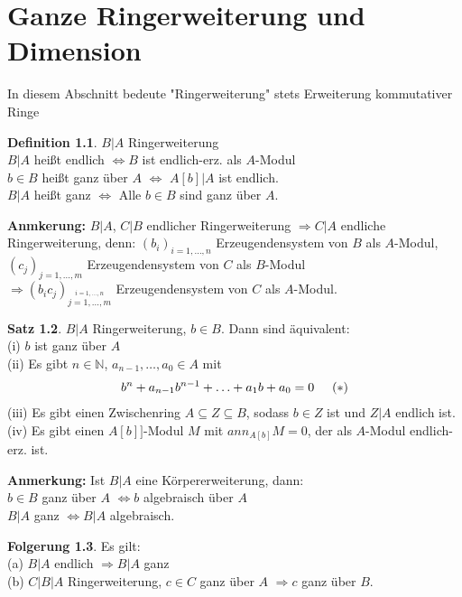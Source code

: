 \documentclass[10pt,a4paper,numbers=endperiod]{scrreprt}
\theoremstyle{definition}
\newtheorem{satz}{Satz}[section]
\newtheorem{defi}[satz]{Definition}
\newtheorem{folg}[satz]{Folgerung}
\def\NN{{\mathbb N}}
\begin{document}
\chapter{Ganze Ringerweiterung und Dimension}

In diesem Abschnitt bedeute "Ringerweiterung" stets Erweiterung kommutativer Ringe

\begin{defi}
	$B|A$ Ringerweiterung\\
	$B|A$ heißt endlich $\Leftrightarrow B$ ist endlich-erz. als $A$-Modul\\
	$b \in B$ heißt ganz über $A$ $\Leftrightarrow$ $A[b]|A$ ist endlich.\\
	$B|A$ heißt ganz $\Leftrightarrow$ Alle $b \in B$ sind ganz über $A$.
\end{defi}

\textbf{Anmkerung:} $B|A$, $C|B$ endlicher Ringerweiterung $\Rightarrow C|A$ endliche Ringerweiterung, denn: $(b_i)_{i = 1, \ldots, n}$ Erzeugendensystem von $B$ als $A$-Modul, $(c_j)_{j = 1, \ldots, m}$ Erzeugendensystem von $C$ als $B$-Modul\\
$\Rightarrow (b_ic_j)_{\stackrel{i = 1, \ldots, n}{j = 1, \ldots, m}}$ Erzeugendensystem von $C$ als $A$-Modul.

\begin{satz}
	$B|A$ Ringerweiterung, $b \in B$. Dann sind äquivalent:\\
	(i) $b$ ist ganz über $A$\\
	(ii) Es gibt $n \in \NN$, $a_{n-1}, \ldots, a_0 \in A$ mit \begin{align*}
		b^n + a_{n-1} b^{n-1} + \ldots + a_1b + a_0 = 0 \hspace*{5 mm} (*)
	\end{align*}
	(iii) Es gibt einen Zwischenring $A \subseteq Z \subseteq B$, sodass $b \in Z$ ist und $Z|A$ endlich ist.\\
	(iv) Es gibt einen $A[b]]$-Modul $M$ mit $ann_{A[b]} M = 0$, der als $A$-Modul endlich-erz. ist.
\end{satz}

\textbf{Anmerkung:} Ist $B|A$ eine Körpererweiterung, dann:\\
$b \in B$ ganz über $A$ $\Leftrightarrow b$ algebraisch über $A$\\
$B|A$ ganz $\Leftrightarrow B|A$ algebraisch.

\begin{folg}
	Es gilt:\\
	(a) $B|A$ endlich $\Rightarrow B|A$ ganz\\
	(b) $C|B|A$ Ringerweiterung, $c \in C$ ganz über $A$ $\Rightarrow c$ ganz über $B$.
\end{folg}
\end{document}
